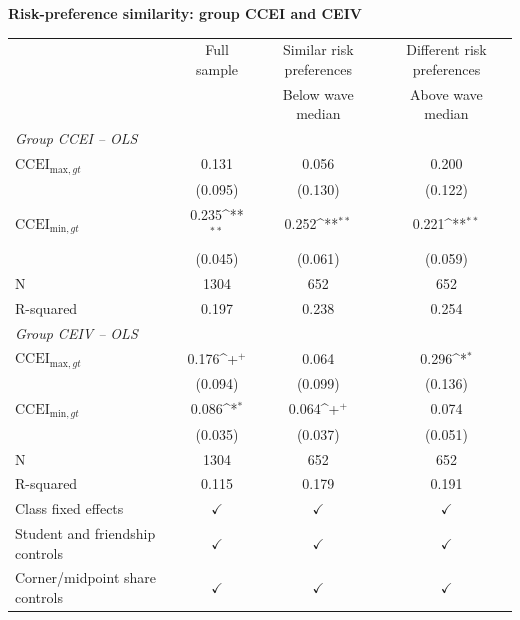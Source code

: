 \documentclass[11pt]{article}
\newcommand{\sym}[1]{\ifmmode^{#1}\else\(^{#1}\)\fi}
\begin{document}
\begin{center}\large\textbf{Risk-preference similarity: group CCEI and CEIV}\end{center}
\begin{center}\small
\begin{tabular}{lccc}\toprule
& Full sample & Similar risk preferences & Different risk preferences\\
& & Below wave median & Above wave median\\
\midrule
\multicolumn{4}{l}{\textit{Group CCEI -- OLS}}\\
$\text{CCEI}_{\text{max},gt}$&    0.131        &    0.056        &    0.200        \\
                &  (0.095)        &  (0.130)        &  (0.122)        \\
$\text{CCEI}_{\text{min},gt}$&    0.235\sym{**}&    0.252\sym{**}&    0.221\sym{**}\\
                &  (0.045)        &  (0.061)        &  (0.059)        \\
\midrule
N               &     1304        &      652        &      652        \\
R-squared       &    0.197        &    0.238        &    0.254        \\
\midrule
\multicolumn{4}{l}{\textit{Group CEIV -- OLS}}\\
$\text{CCEI}_{\text{max},gt}$&    0.176\sym{+} &    0.064        &    0.296\sym{*} \\
                &  (0.094)        &  (0.099)        &  (0.136)        \\
$\text{CCEI}_{\text{min},gt}$&    0.086\sym{*} &    0.064\sym{+} &    0.074        \\
                &  (0.035)        &  (0.037)        &  (0.051)        \\
\midrule
N               &     1304        &      652        &      652        \\
R-squared       &    0.115        &    0.179        &    0.191        \\

Class fixed effects & $\checkmark$ & $\checkmark$ & $\checkmark$\\
Student and friendship controls & $\checkmark$ & $\checkmark$ & $\checkmark$\\
Corner/midpoint share controls & $\checkmark$ & $\checkmark$ & $\checkmark$\\
\bottomrule
\end{tabular}\end{center}
\end{document}
